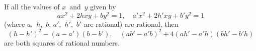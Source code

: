 If all the values of $x$~and~$y$ given by
\[
ax^{2} + 2hxy + by^{2} = 1,\quad
a'x^{2} + 2h'xy + b'y^{2} = 1
\]
(where $a$,~$h$,~$b$, $a'$,~$h'$,~$b'$ are rational) are rational, then
\[
(h - h')^{2} - (a - a')(b - b'),\quad
(ab' - a'b)^{2} + 4(ah' - a'h)(bh' - b'h)
\]
are both squares of rational numbers. 
